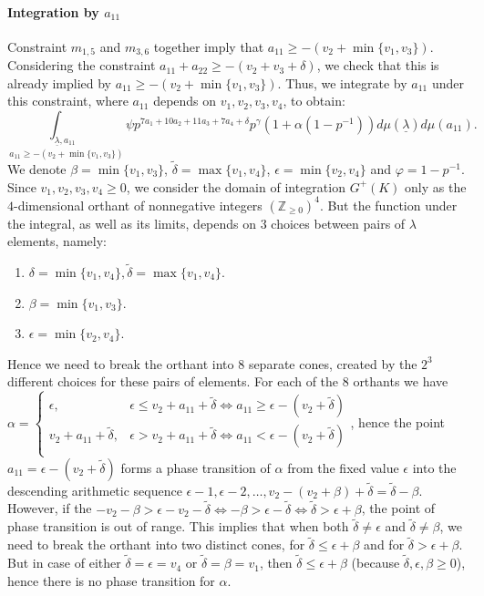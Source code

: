 \documentclass{article}
\begin{document}
\paragraph{Integration by $a_{11}$}
Constraint $m_{1,5}$ and $m_{3,6}$ together imply that $a_{11}\geq-(v_2+\min\{v_1,v_3\})$. Considering the constraint $a_{11}+a_{22}\geq-(v_2+v_3+\delta)$, we check that this is already implied by $a_{11}\geq-(v_2+\min\{v_1,v_3\})$. Thus, we integrate by $a_{11}$ under this constraint, where $a_{11}$ depends on $v_1,v_2,v_3,v_4$, to obtain:
\[\underset{a_{11}\geq-(v_2+\min\{v_1,v_3\})}{\int_{\underline\lambda,a_{11}}}\psi{p}^{7a_1+10a_2+11a_3+7a_4+\delta}p^{\gamma}(1+\alpha(1-p^{-1}))d\mu(\underline\lambda)d\mu(a_{11}).\]
We denote $\beta=\min\{v_1,v_3\}$, $\tilde\delta=\max\{v_1,v_4\}$, $\epsilon=\min\{v_2,v_4\}$ and $\varphi=1-p^{-1}$.\\
Since $v_1,v_2,v_3,v_4\geq{0}$, we consider the domain of integration $G^{+}(K)$ only as the $4$-dimensional orthant of nonnegative integers $(\mathbb{Z}_{\geq{0}})^4$. But the function under the integral, as well as its limits, depends on $3$ choices between pairs of $\lambda$ elements, namely:
\begin{enumerate}
    \item $\delta=\min\{v_1,v_4\},\tilde\delta=\max\{v_1,v_4\}$.
    \item $\beta=\min\{v_1,v_3\}$.
    \item $\epsilon=\min\{v_2,v_4\}$.
\end{enumerate}
Hence we need to break the orthant into $8$ separate cones, created by the $2^3$ different choices for these pairs of elements.
For each of the $8$ orthants we have $\alpha=
\begin{cases}
\epsilon,&\epsilon\leq{v_2+a_{11}+\tilde\delta}\iff{a_{11}}\geq{\epsilon-(v_2+\tilde\delta)}\\
v_2+a_{11}+\tilde\delta,&\epsilon>{v_2+a_{11}+\tilde\delta}\iff{a_{11}}<{\epsilon-(v_2+\tilde\delta)}\\
\end{cases}$,
hence the point $a_{11}=\epsilon-(v_2+\tilde\delta)$ forms a phase transition of $\alpha$ from the fixed value $\epsilon$ into the descending arithmetic sequence $\epsilon-1,\epsilon-2,\dots,v_2-(v_2+\beta)+\tilde\delta=\tilde\delta-\beta$. However, if the $-v_2-\beta>\epsilon-v_2-\tilde\delta\iff-\beta>\epsilon-\tilde\delta\iff\tilde\delta>\epsilon+\beta$, the point of phase transition is out of range. This implies that when both $\tilde\delta\neq\epsilon$ and $\tilde\delta\neq\beta$, we need to break the orthant into two distinct cones, for $\tilde\delta\leq\epsilon+\beta$ and for $\tilde\delta>\epsilon+\beta$. But in case of either $\tilde\delta=\epsilon=v_4$ or $\tilde\delta=\beta=v_1$, then $\tilde\delta\leq\epsilon+\beta$ (because $\tilde\delta,\epsilon,\beta\geq{0}$), hence there is no phase transition for $\alpha$.
\end{document}
